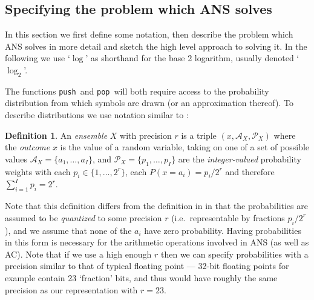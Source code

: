 \documentclass{article}
\theoremstyle{definition}
\newtheorem{definition}{Definition}
\newcommand{\push}{\texttt{push}}
\newcommand{\pop}{\texttt{pop}}
\begin{document}
\subsection{Specifying the problem which ANS solves}\label{sec:prob-spec}
  In this section we first define some notation, then describe the problem
  which ANS solves in more detail and sketch the high level approach to solving
  it. In the following we use `\(\log\)' as shorthand for the base 2 logarithm,
  usually denoted `\(\log_2\)'.

  The functions \push\ and \pop\ will both require access to the probability
  distribution from which symbols are drawn (or an approximation thereof). To
  describe distributions we use notation similar to \citet{mackay2003}:
  \begin{definition}\label{def:ensemble}
    An \emph{ensemble} \(X\) with precision \(r\) is a triple \((x,
    \mathcal{A}_X, \mathcal{P}_X)\) where the \emph{outcome} \(x\) is the value
    of a random variable, taking on one of a set of possible values
    \(\mathcal{A}_X = \{a_1, \ldots, a_I\}\), and \(\mathcal{P}_X = \{p_1,
    \ldots, p_I\}\) are the \emph{integer-valued} probability weights with each
    \(p_i\in\{1, \ldots, 2^r\}\), each \(P(x=a_i) = p_i / 2^r\) and therefore
    \(\sum_{i=1}^Ip_i = 2^r\).
  \end{definition}
  Note that this definition differs from the definition in \citet{mackay2003}
  in that the probabilities are assumed to be \emph{quantized}  to some
  precision \(r\) (i.e.\ representable by fractions \(p_i/2^r\)), and we assume
  that none of the \(a_i\) have zero probability. Having probabilities in this
  form is necessary for the arithmetic operations involved in ANS (as well as
  AC). Note that if we use a high enough \(r\) then we can specify
  probabilities with a precision similar to that of typical floating point ---
  32-bit floating points for example contain 23 `fraction' bits, and thus would
  have roughly the same precision as our representation with \(r=23\).
\end{document}
